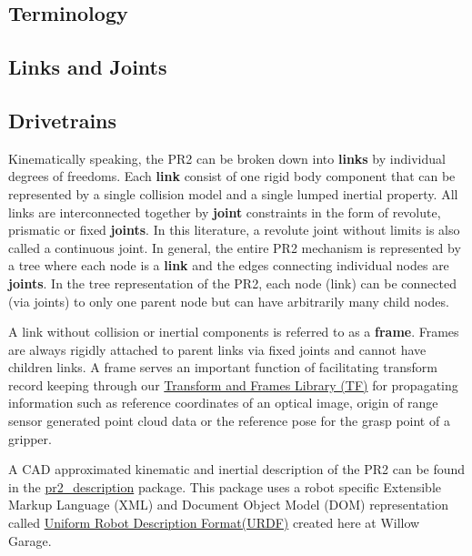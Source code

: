 \subsection{Terminology}

\subsection{Links and Joints}


\subsection{Drivetrains}


Kinematically speaking, the PR2 can be broken down into {\bf links} by individual degrees of freedoms.  Each {\bf link} consist of one
rigid body component that can be represented by a single collision model and a single lumped inertial property.
All links are interconnected together by {\bf joint} constraints in the form of revolute, prismatic or fixed {\bf joints}.
In this literature, a revolute joint without limits is also called a continuous joint.
In general, the entire PR2 mechanism is represented by a tree where each node is a {\bf link}
  and the edges connecting individual nodes are {\bf joints}.
In the tree representation of the PR2, each node (link) can be connected (via joints) to only one parent node but can have arbitrarily many child nodes.

A link without collision or inertial components is referred to as a {\bf frame}. Frames are always rigidly attached to parent links via fixed joints and cannot have children links.
A frame serves an important function of facilitating transform record keeping through our \href{http://www.ros.org/wiki/tf}{Transform and Frames Library (TF)}
  for propagating information such as reference coordinates of an optical image, origin of range sensor generated point cloud data or the reference pose for the grasp point of a gripper.

A CAD approximated kinematic and inertial description of the PR2 can be found
  in the \href{http://www.ros.org/wiki/pr2\_description}{pr2\_description} package.
This package uses a robot specific Extensible Markup Language (XML) and Document Object Model (DOM) representation
  called \href{http://www.ros.org/wiki/urdf}{Uniform Robot Description Format(URDF)} created here at Willow Garage.

